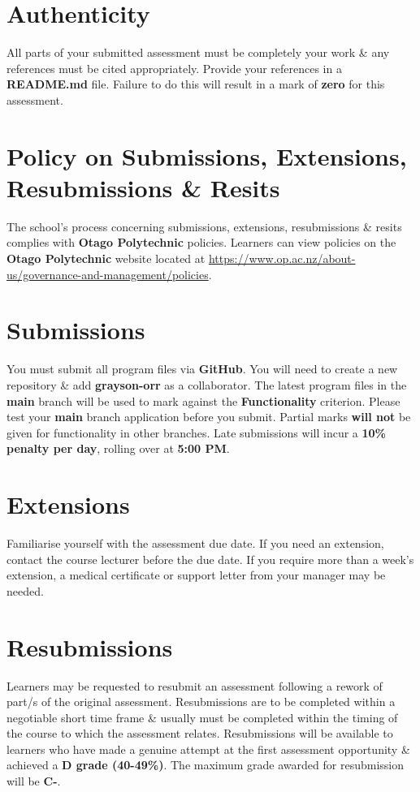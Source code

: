 \documentclass{article}
\begin{document}
\section*{Authenticity}
All parts of your submitted assessment must be completely your work \& any references must be cited appropriately. Provide your references in a \textbf{README.md} file. Failure to do this will result in a mark of \textbf{zero} for this assessment.

\section*{Policy on Submissions, Extensions, Resubmissions \& Resits}
The school's process concerning submissions, extensions, resubmissions \& resits complies with \textbf{Otago Polytechnic} policies. Learners can view policies on the \textbf{Otago Polytechnic} website located at \href{https://www.op.ac.nz/about-us/governance-and-management/policies}{https://www.op.ac.nz/about-us/governance-and-management/policies}.

\section*{Submissions}
You must submit all program files via \textbf{GitHub}. You will need to create a new repository \& add \textbf{grayson-orr} as a collaborator. The latest program files in the \textbf{main} branch will be used to mark against the \textbf{Functionality} criterion. Please test your \textbf{main} branch application before you submit. Partial marks \textbf{will not} be given for functionality in other branches. Late submissions will incur a \textbf{10\% penalty per day}, rolling over at \textbf{5:00 PM}.

\section*{Extensions}
Familiarise yourself with the assessment due date. If you need an extension, contact the course lecturer before the due date. If you require more than a week's extension, a medical certificate or support letter from your manager may be needed.

\section*{Resubmissions}
Learners may be requested to resubmit an assessment following a rework of part/s of the original assessment. Resubmissions are to be completed within a negotiable short time frame \& usually must be completed within the timing of the course to which the assessment relates. Resubmissions will be available to learners who have made a genuine attempt at the first assessment opportunity \& achieved a \textbf{D grade (40-49\%)}. The maximum grade awarded for resubmission will be \textbf{C-}.
\end{document}
